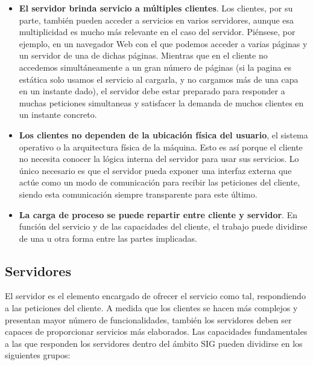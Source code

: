 \begin{itemize}
	\item \textbf{El servidor brinda servicio a múltiples clientes}. Los clientes, por su parte, también pueden acceder a servicios en varios servidores, aunque esa multiplicidad es mucho más relevante en el caso del servidor. Piénsese, por ejemplo, en un navegador Web con el que podemos acceder a varias páginas y un servidor de una de dichas páginas. Mientras que en el cliente no accedemos simultáneamente a un gran número de páginas (si la pagina es estática solo usamos el servicio al cargarla, y no cargamos más de una capa en un instante dado), el servidor debe estar preparado para responder a muchas peticiones simultaneas y satisfacer la demanda de muchos clientes en un instante concreto.
	\item \textbf{Los clientes no dependen de la ubicación física del usuario}, el sistema operativo o la arquitectura física de la máquina. Esto es así porque el cliente no necesita conocer la lógica interna del servidor para usar sus servicios. Lo único necesario es que el servidor pueda exponer una interfaz externa que actúe como un modo de comunicación para recibir las peticiones del cliente, siendo esta comunicación siempre transparente para este último. 
	\item \textbf{La carga de proceso se puede repartir entre cliente y servidor}. En función del servicio y de las capacidades del cliente, el trabajo puede dividirse de una u otra forma entre las partes implicadas.
\end{itemize}



\subsection{Servidores}
\label{Servidores}

El servidor es el elemento encargado de ofrecer el servicio como tal, respondiendo a las peticiones del cliente. A medida que los clientes se hacen más complejos y presentan mayor número de funcionalidades, también los servidores deben ser capaces de proporcionar servicios más elaborados. Las capacidades fundamentales a las que responden los servidores dentro del ámbito SIG pueden dividirse en los siguientes grupos:

